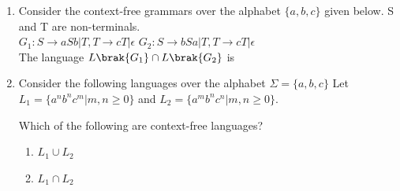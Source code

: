 \documentclass[a4paper, 11pt]{article}
\begin{document}
\begin{enumerate}
    \hfill{}

    \item Consider the context-free grammars over the alphabet $\{a, b, c\}$ given below. S and T are non-terminals.\\
    $G_{1}:S\to aSb|T, T\to cT|\epsilon$
    $G_{2}:S\to bSa|T, T\to cT|\epsilon$\\
    The language $L\brak{G_{1}}\cap L\brak{G_{2}}$ is
    \begin{enumerate}
    \end{enumerate}
    
    \hfill{}

    \item Consider the following languages over the alphabet $\Sigma=\{a,b,c\}$
    Let $L_{1}=\{a^{n}b^{n}c^{m}|m,n\ge0\}$ and $L_{2}=\{a^{m}b^{n}c^{n}|m,n\ge0\}$.
    
    Which of the following are context-free languages?
    \begin{enumerate}[label=\Roman*]
        \item $L_{1}\cup L_{2}$
        \item $L_{1}\cap L_{2}$
    \end{enumerate}    
    \begin{enumerate}
    \end{enumerate}
    
    \hfill{}


\end{enumerate}
\end{document}
